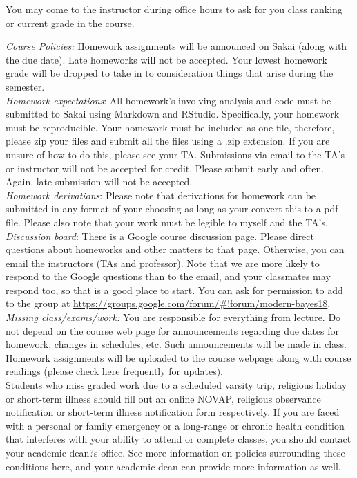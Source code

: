 \documentclass[11pt]{article}
\begin{document}
You may come to the instructor during office hours to ask for you class ranking or current grade in the course. 

\emph{Course Policies:} 
Homework assignments will be announced on Sakai (along with the due date). Late homeworks will not be accepted. Your lowest homework grade will be dropped to take in to consideration things that arise during the semester. \\

\emph{Homework expectations}: All homework's involving analysis and code must be submitted to Sakai using Markdown and RStudio. Specifically, your homework must be reproducible. Your homework must be included as one file, therefore, please zip your files and submit all the files using a .zip extension. If you are unsure of how to do this, please see your TA. Submissions via email to the TA's or instructor will not be accepted for credit. Please submit early and often. Again, late submission will not be accepted. \\

\emph{Homework derivations}: Please note that derivations for homework can be submitted in any format of your choosing as long as your convert this to a pdf file. Please also note that your work must be legible to myself and the TA's. \\


\emph{Discussion board}:
There is a Google course discussion page. Please direct questions about homeworks and other matters to that page. Otherwise, you can email the instructors (TAs and professor). Note that we are more likely to respond to the Google questions than to the email, and your classmates may respond too, so that is a good place to start. You can ask for permission to add to the group at \url{https://groups.google.com/forum/#!forum/modern-bayes18}.\\

\emph{Missing class/exams/work:}
You are responsible for everything from lecture. Do not depend on the course web page for announcements regarding due dates for homework, changes in schedules, etc. Such announcements will be made in class. Homework assignments will be uploaded to the course webpage along with course readings (please check here frequently for updates).\\

Students who miss graded work due to a scheduled varsity trip, religious holiday or short-term illness should fill out an online NOVAP, religious observance notification or short-term illness notification form respectively. If you are faced with a personal or family emergency or a long-range or chronic health condition that interferes with your ability to attend or complete classes, you should contact your academic dean?s office. See more information on policies surrounding these conditions here, and your academic dean can provide more information as well.\\
\end{document}
